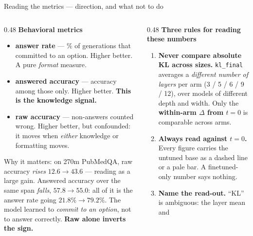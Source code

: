 \documentclass[aspectratio=169,10pt]{beamer}
\newcommand{\good}[1]{\textcolor{up}{#1}}
\newcommand{\bad}[1]{\textcolor{down}{#1}}
\begin{document}
\begin{frame}{Reading the metrics --- direction, and what not to do}
  \small
  \begin{columns}[T]
    \begin{column}{0.48\textwidth}
      \textbf{Behavioral metrics}
      \vspace{0.3em}
      {\footnotesize
      \begin{itemize}\setlength{\itemsep}{0.25em}
        \item \textbf{answer rate} --- \% of generations that committed to an
          option. \good{Higher better.} A pure \emph{format} measure.
        \item \textbf{answered accuracy} --- accuracy among those only.
          \good{Higher better.} \textbf{This is the knowledge signal.}
        \item \textbf{raw accuracy} --- non-answers counted wrong.
          \good{Higher better}, but confounded: it moves when \emph{either}
          knowledge or formatting moves.
      \end{itemize}}
      \vspace{0.4em}
      {\footnotesize \bad{Why it matters:} on 270m PubMedQA, raw accuracy
      \emph{rises} $12.6 \rightarrow 43.6$ --- reading as a large gain. Answered
      accuracy over the same span \emph{falls}, $57.8 \rightarrow 55.0$: all of
      it is the answer rate going $21.8\% \rightarrow 79.2\%$. The model learned
      to \emph{commit to an option}, not to answer correctly.
      \textbf{Raw alone inverts the sign.}}
    \end{column}
    \begin{column}{0.48\textwidth}
      \textbf{Three rules for reading these numbers}
      \vspace{0.3em}
      {\footnotesize
      \begin{enumerate}\setlength{\itemsep}{0.4em}
        \item \textbf{Never compare absolute KL across sizes.} \texttt{kl\_final}
          averages a \emph{different number of layers} per arm (3 / 5 / 6 / 9 / 12),
          over models of different depth and width. Only the \textbf{within-arm
          $\Delta$ from $t{=}0$} is comparable across arms.
        \item \textbf{Always read against $t{=}0$.} Every figure carries the
          untuned base as a dashed line or a pale bar. A finetuned-only number
          says nothing.
        \item \textbf{Name the read-out.} ``KL'' is ambiguous: the layer mean and

\end{enumerate}}
\end{column}
\end{columns}
\end{frame}
\end{document}
